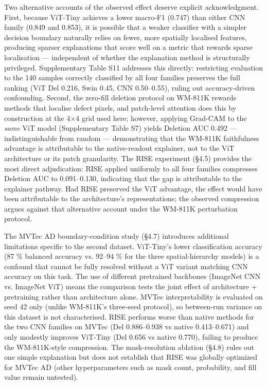 \documentclass[11pt,a4paper]{article}
\begin{document}
Two alternative accounts of the observed effect deserve explicit acknowledgment. First, because ViT-Tiny achieves a lower macro-F1 (0.747) than either CNN family (0.849 and 0.853), it is possible that a weaker classifier with a simpler decision boundary naturally relies on fewer, more spatially localised features, producing sparser explanations that score well on a metric that rewards sparse localisation --- independent of whether the explanation method is structurally privileged. Supplementary Table S11 addresses this directly: restricting evaluation to the 140 samples correctly classified by all four families preserves the full ranking (ViT Del 0.216, Swin 0.45, CNN 0.50--0.55), ruling out accuracy-driven confounding. Second, the zero-fill deletion protocol on WM-811K rewards methods that localise defect pixels, and patch-level attention does this by construction at the 4$\times$4 grid
used here; however, applying Grad-CAM to the \emph{same} ViT model (Supplementary Table S7) yields Deletion AUC 0.492 --- indistinguishable from random --- demonstrating that the WM-811K faithfulness advantage is attributable to the native-readout explainer, not to the ViT architecture or its patch granularity. The RISE experiment (\S{}4.5) provides the most direct adjudication: RISE applied uniformly to all four families compresses Deletion AUC to 0.091--0.130, indicating that the gap is attributable to the explainer pathway. Had RISE preserved the ViT advantage, the effect would have been attributable to the architecture's representations; the observed compression argues against that alternative account under the WM-811K perturbation protocol.

The MVTec AD boundary-condition study (\S{}4.7) introduces additional limitations specific to the second dataset. ViT-Tiny's lower classification accuracy (87 \% balanced accuracy vs. 92--94 \% for the three spatial-hierarchy models) is a confound that cannot be fully resolved without a ViT variant matching CNN accuracy on this task. The use of different pretrained backbones (ImageNet CNN vs. ImageNet ViT) means the comparison tests the joint effect of architecture + pretraining rather than architecture alone. MVTec interpretability is evaluated on seed 42 only (unlike WM-811K's three-seed protocol), so between-run variance on this dataset is not characterised. RISE performs worse than native methods for the two CNN families on MVTec (Del 0.886--0.938 vs native 0.413--0.671) and only modestly improves ViT-Tiny (Del 0.656 vs native 0.770), failing to produce the WM-811K-style compression. The mask-resolution ablation
(\S{}4.8) rules out one simple explanation but does not establish that RISE was globally optimized for MVTec AD (other hyperparameters such as mask count, probability, and fill value remain untested).
\end{document}
